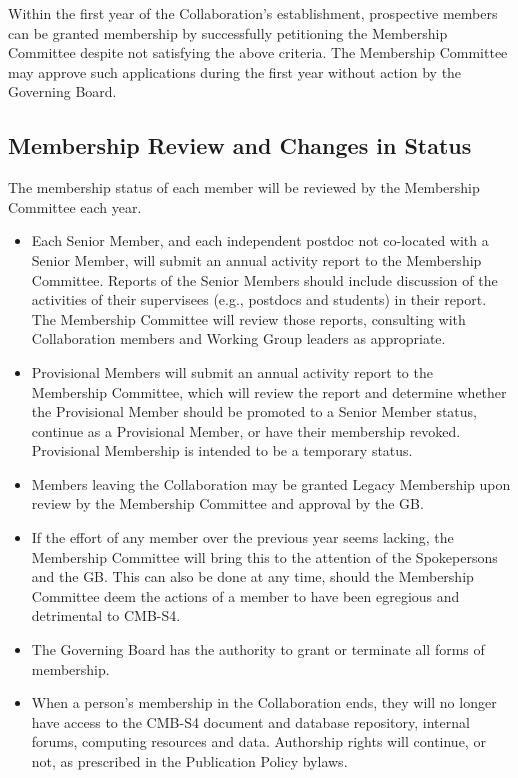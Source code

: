 \documentclass[12pt]{article}
\begin{document}
Within the first year of the Collaboration's establishment, prospective members can be granted membership by successfully petitioning the Membership Committee despite not satisfying the above criteria.  The Membership Committee may approve such applications during the first year without action by the Governing Board.  


\subsection{Membership Review and Changes in Status}
The membership status of each member will be reviewed by the Membership Committee each year. 

\begin{itemize} 

\item Each Senior Member, and each independent postdoc not co-located with a Senior Member, will submit an annual activity report to the Membership Committee.  Reports of the Senior Members should include discussion of the activities of their supervisees (e.g., postdocs and students) in their report. The Membership Committee will review those reports, consulting with Collaboration members and Working Group leaders as appropriate.

\item Provisional Members will submit an annual activity report to the Membership Committee, which will review the report and determine whether the Provisional Member should be promoted to a Senior Member status, continue as a Provisional Member, or have their membership revoked.  Provisional Membership is intended to be a temporary status.

\item Members leaving the Collaboration may be granted Legacy Membership upon review by the Membership Committee and approval by the GB.

\item If the effort of any member over the previous year seems lacking, the Membership Committee will bring this to the attention of the Spokepersons and the GB.  This can also be done at any time, should the Membership Committee deem the actions of a member to have been egregious and detrimental to CMB-S4.

\item The Governing Board has the authority to grant or terminate all forms of membership.

\item When a person's membership in the Collaboration ends, they will no longer have access to the CMB-S4 document and database repository, internal forums, computing resources and data.  Authorship rights will continue, or not, as prescribed in the Publication Policy bylaws.


\end{itemize}
\end{document}
